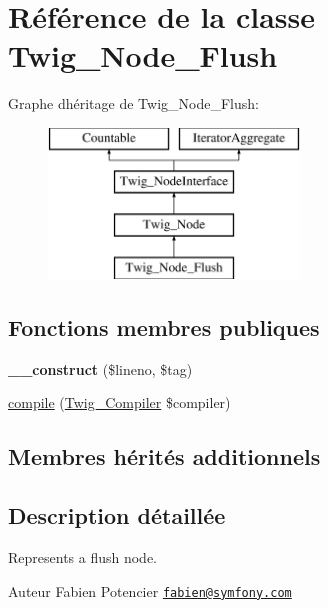 \hypertarget{class_twig___node___flush}{}\section{Référence de la classe Twig\+\_\+\+Node\+\_\+\+Flush}
\label{class_twig___node___flush}
Graphe d\textquotesingle{}héritage de Twig\+\_\+\+Node\+\_\+\+Flush\+:\begin{figure}[H]
\begin{center}
\leavevmode
\includegraphics[height=4.000000cm]{class_twig___node___flush}
\end{center}
\end{figure}
\subsection*{Fonctions membres publiques}
\begin{DoxyCompactItemize}
\item 
{\bfseries \+\_\+\+\_\+construct} (\$lineno, \$tag)\hypertarget{class_twig___node___flush_a5e1f46c5aa1e5e46a8b68df0c28f0e04}{}\label{class_twig___node___flush_a5e1f46c5aa1e5e46a8b68df0c28f0e04}

\item 
\hyperlink{class_twig___node___flush_a4e0faa87c3fae583620b84d3607085da}{compile} (\hyperlink{class_twig___compiler}{Twig\+\_\+\+Compiler} \$compiler)
\end{DoxyCompactItemize}
\subsection*{Membres hérités additionnels}


\subsection{Description détaillée}
Represents a flush node.

\begin{DoxyAuthor}{Auteur}
Fabien Potencier \href{mailto:fabien@symfony.com}{\tt fabien@symfony.\+com} 
\end{DoxyAuthor}


